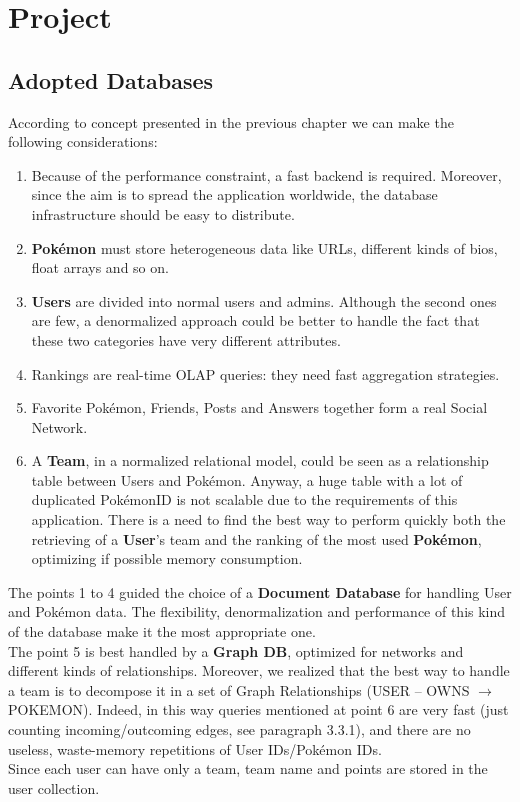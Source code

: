 \section{Project}
\subsection{Adopted Databases}
According to concept presented in the previous chapter we can make the following considerations:
\begin{enumerate}
\item Because of the performance constraint, a fast backend is required. Moreover, since the aim is to spread the application worldwide, the database infrastructure should be easy to distribute.
\item \textbf{Pokémon} must store heterogeneous data like URLs, different kinds of bios, float arrays and so on.
\item \textbf{Users} are divided into normal users and admins. Although the second ones are few, a denormalized approach could be better to handle the fact that these two categories have very different attributes.
\item Rankings are real-time OLAP queries: they need fast aggregation strategies.
\item Favorite Pokémon, Friends, Posts and Answers together form a real Social Network.
\item A \textbf{Team}, in a normalized relational model, could be seen as a relationship table between Users and Pokémon. Anyway, a huge table with a lot of duplicated PokémonID is not scalable due to the requirements of this application. There is a need to find the best way to perform quickly both the retrieving of a \textbf{User}’s team and the ranking of the most used \textbf{Pokémon}, optimizing if possible memory consumption.
\end{enumerate}

The points 1 to 4 guided the choice of a \textbf{Document Database} for handling User and Pokémon data. The flexibility, denormalization and performance of this kind of the database make it the most appropriate one.\medspace \\

The point 5 is best handled by a \textbf{Graph DB}, optimized for networks and different kinds of relationships. Moreover, we realized that the best way to handle a team is to decompose it in a set of Graph Relationships (USER – OWNS $\rightarrow$ POKEMON).  Indeed, in this way queries mentioned at point 6 are very fast (just counting incoming/outcoming edges, see paragraph 3.3.1), and there are no useless, waste-memory repetitions of User IDs/Pokémon IDs. \\
Since each user can have only a team, team name and points are stored in the user collection.


